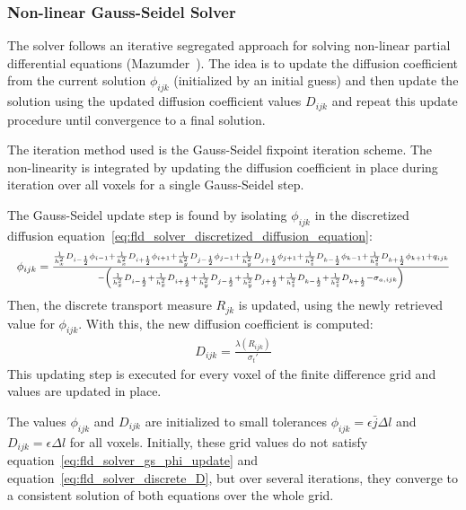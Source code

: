 \subsubsection*{Non-linear Gauss-Seidel Solver}

The solver follows an iterative segregated approach for solving non-linear partial differential equations (Mazumder~\cite{Mazumder2015}). The idea is to update the diffusion coefficient from the current solution $\phi_{ijk}$ (initialized by an initial guess) and then update the solution using the updated diffusion coefficient values $D_{ijk}$ and repeat this update procedure until convergence to a final solution.

The iteration method used is the Gauss-Seidel fixpoint iteration scheme. The non-linearity is integrated by updating the diffusion coefficient in place during iteration over all voxels for a single Gauss-Seidel step.

The Gauss-Seidel update step is found by isolating $\phi_{ijk}$ in the discretized diffusion equation~\ref{eq:fld_solver_discretized_diffusion_equation}:
\begin{equation}
\label{eq:fld_solver_gs_phi_update}
\resizebox{1.0\hsize}{!}{$
\phi_{ijk} =
\\
\frac
{
\frac{1}{h_x^2}D_{i-\frac{1}{2}}\phi_{i-1}
+\frac{1}{h_x^2}D_{i+\frac{1}{2}}\phi_{i+1}
+\frac{1}{h_y^2}D_{j-\frac{1}{2}}\phi_{j-1}
+\frac{1}{h_y^2}D_{j+\frac{1}{2}}\phi_{j+1}
+\frac{1}{h_z^2}D_{k-\frac{1}{2}}\phi_{k-1}
+\frac{1}{h_z^2}D_{k+\frac{1}{2}}\phi_{k+1}
+q_{ijk}
}
{
-\left(
\frac{1}{h_x^2}D_{i-\frac{1}{2}}+\frac{1}{h_x^2}D_{i+\frac{1}{2}}
+\frac{1}{h_y^2}D_{j-\frac{1}{2}}+\frac{1}{h_y^2}D_{j+\frac{1}{2}}
+\frac{1}{h_z^2}D_{k-\frac{1}{2}}+\frac{1}{h_z^2}D_{k+\frac{1}{2}}
-\sigma_{a, ijk}
\right)
}
$}
\end{equation}
Then, the discrete transport measure $R_{jk}$ is updated, using the newly retrieved value for $\phi_{ijk}$. With this, the new diffusion coefficient is computed:
\begin{align}
D_{ijk} = \frac{\lambda\left(R_{ijk}\right)}{\sigma_t'}
\label{eq:fld_solver_discrete_D}
\end{align}
This updating step is executed for every voxel of the finite difference grid and values are updated in place.

The values $\phi_{ijk}$ and $D_{ijk}$ are initialized to small tolerances $\phi_{ijk} = \epsilon \bar{j}\Delta l$ and $D_{ijk} = \epsilon \Delta l$ for all voxels. Initially, these grid values do not satisfy equation~\ref{eq:fld_solver_gs_phi_update} and equation~\ref{eq:fld_solver_discrete_D}, but over several iterations, they converge to a consistent solution of both equations over the whole grid. 

